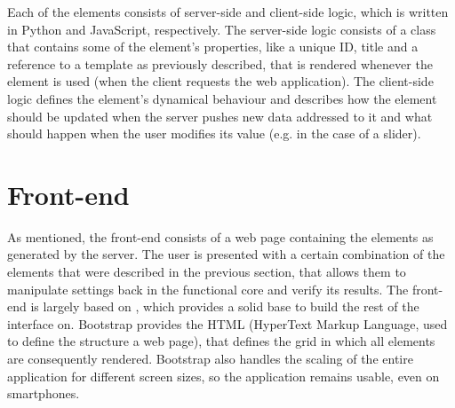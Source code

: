 \documentclass[a4paper, openany, oneside]{memoir}
\begin{document}
Each of the elements consists of server-side and client-side logic, which is written in Python and JavaScript, respectively. The server-side logic consists of a class that contains some of the element's properties, like a unique ID, title and a reference to a  template as previously described, that is rendered whenever the element is used (when the client requests the web application). The client-side logic defines the element's dynamical behaviour and describes how the element should be updated when the server pushes new data addressed to it and what should happen when the user modifies its value (e.g. in the case of a slider).

\section{Front-end}
\label{sec:clientside}
As mentioned, the front-end consists of a web page containing the elements as generated by the server. The user is presented with a certain combination of the elements that were described in the previous section, that allows them to manipulate settings back in the functional core and verify its results. The front-end is largely based on , which provides a solid base to build the rest of the interface on. Bootstrap provides the HTML (HyperText Markup Language, used to define the structure a web page), that defines the grid in which all elements are consequently rendered. Bootstrap also handles the scaling of the entire application for different screen sizes, so the application remains usable, even on smartphones.
\end{document}

